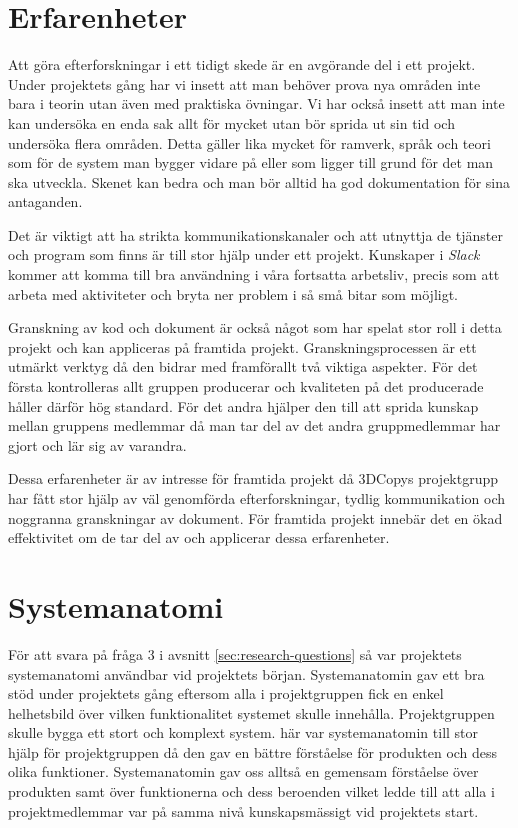 \section{Erfarenheter}

Att göra efterforskningar i ett tidigt skede är en avgörande del i ett projekt. Under projektets gång har vi insett att man behöver prova nya områden inte bara i teorin utan även med praktiska övningar. Vi har också insett att man inte kan undersöka en enda sak allt för mycket utan bör sprida ut sin tid och undersöka flera områden. Detta gäller lika mycket för ramverk, språk och teori som för de system man bygger vidare på eller som ligger till grund för det man ska utveckla. Skenet kan bedra och man bör alltid ha god dokumentation för sina antaganden.

Det är viktigt att ha strikta kommunikationskanaler och att utnyttja de tjänster och program som finns är till stor hjälp under ett projekt. Kunskaper i \textit{Slack} kommer att komma till bra användning i våra fortsatta arbetsliv, precis som att arbeta med aktiviteter och bryta ner problem i så små bitar som möjligt.

Granskning av kod och dokument är också något som har spelat stor roll i detta projekt och kan appliceras på framtida projekt. Granskningsprocessen är ett utmärkt verktyg då den bidrar med framförallt två viktiga aspekter. För det första kontrolleras allt gruppen producerar och kvaliteten på det producerade håller därför hög standard. För det andra hjälper den till att sprida kunskap mellan gruppens medlemmar då man tar del av det andra gruppmedlemmar har gjort och lär sig av varandra.

Dessa erfarenheter är av intresse för framtida projekt då 3DCopys projektgrupp har fått stor hjälp av väl genomförda efterforskningar, tydlig kommunikation och noggranna granskningar av dokument. För framtida projekt innebär det en ökad effektivitet om de tar del av och applicerar dessa erfarenheter.

\section{Systemanatomi}
För att svara på fråga 3 i avsnitt \ref{sec:research-questions} så var projektets systemanatomi användbar vid projektets början. Systemanatomin gav ett bra stöd under projektets gång eftersom alla i projektgruppen fick en enkel helhetsbild över vilken funktionalitet systemet skulle innehålla. Projektgruppen skulle bygga ett stort och komplext system. här var systemanatomin till stor hjälp för projektgruppen då den gav en bättre förståelse för produkten och dess olika funktioner. Systemanatomin gav oss alltså en gemensam förståelse över produkten samt över funktionerna och dess beroenden vilket ledde till att alla i projektmedlemmar var på samma nivå kunskapsmässigt vid projektets start.

